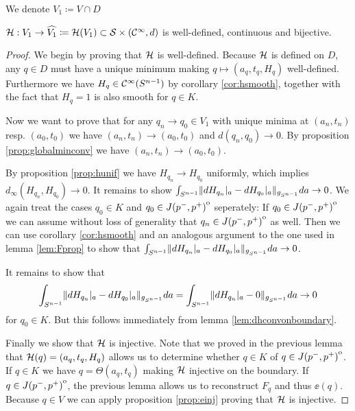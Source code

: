 We denote $V_1\coloneqq V\cap D$
\begin{lemma}
    ${\mathcal{H}}:V_1\to \widehat{V_1}\coloneqq {\mathcal{H}}(V_1)\subset {\mathcal{S}}\times({\mathcal{C}}^\infty, d)$ is well-defined, continuous and bijective.
\end{lemma}
\begin{proof}
    We begin by proving that ${\mathcal{H}}$ is well-defined. Because ${\mathcal{H}}$ is defined on $D$, any $q\in D$ must have a unique minimum making $q\mapsto(a_q,t_q,H_q)$ well-defined. Furthermore we have $H_q\in {\mathcal{C}}^\infty({S^{n-1}})$ by corollary \ref{cor:hsmooth}, together with the fact that $H_q=1$ is also smooth for $q\in K$.

    Now we want to prove that for any $q_n\to q_0\in V_1$ with unique minima at $(a_n,t_n)$ resp. $(a_0,t_0)$ we have $(a_n,t_n) \to (a_0,t_0)$ and $d(q_n,q_0)\to 0$. By proposition \ref{prop:globalminconv} we have $(a_n,t_n) \to (a_0,t_0)$.
    
    By proposition \ref{prop:hunif} we have $H_{q_n}\to H_{q_0}$ uniformly, which implies $d_\infty(H_{q_n},H_{q_0})\to 0$. It remains to show $\int_{{S^{n-1}}} \lVert dH_{q_n}\rvert_a - dH_{q_0}\rvert_a \rVert_{g_{S^{n-1}}}da \to 0$. We again treat the cases $q_0\in K$ and $q_0\in {\kern0ptJ(p^-,p^+)}^{\mathrm{o}}$ seperately: If $q_0\in {\kern0ptJ(p^-,p^+)}^{\mathrm{o}}$ we can assume without loss of generality that $q_n\in {\kern0ptJ(p^-,p^+)}^{\mathrm{o}}$ as well. Then we can use corollary \ref{cor:hsmooth} and an analogous argument to the one used in lemma \ref{lem:Fprop} to show that $\int_{{S^{n-1}}} \lVert dH_{q_n}\rvert_a - dH_{q_0}\rvert_a \rVert_{g_{S^{n-1}}}da \to 0$.

    It remains to show that 
    \[
        \int_{{S^{n-1}}} \lVert dH_{q_n}\rvert_a - dH_{q_0}\rvert_a \rVert_{g_{S^{n-1}}}da = \int_{{S^{n-1}}} \lVert dH_{q_n}\rvert_a - 0\rVert_{g_{S^{n-1}}}da \to 0
    \] for $q_0\in K$. But this follows immediately from lemma \ref{lem:dhconvonboundary}.

    Finally we show that ${\mathcal{H}}$ is injective. Note that we proved in the previous lemma that ${\mathcal{H}}(q)=(a_q,t_q,H_q)$ allows us to determine whether $q\in K$ of $q\in {\kern0ptJ(p^-,p^+)}^{\mathrm{o}}$.
    If $q\in K$ we have $q = \Theta(a_q,t_q)$ making ${\mathcal{H}}$ injective on the boundary. If $q\in {\kern0ptJ(p^-,p^+)}^{\mathrm{o}}$, the previous lemma allows us to reconstruct $F_q$ and thus $\ee(q)$. Because $q\in V$ we can apply proposition \ref{prop:einj} proving that ${\mathcal{H}}$ is injective.
\end{proof}

